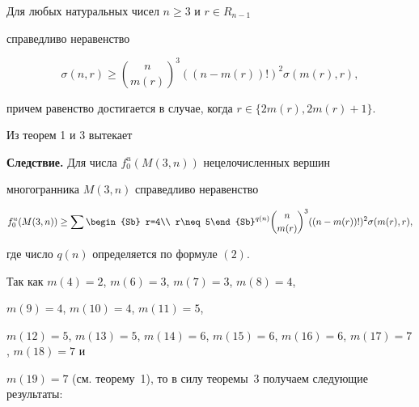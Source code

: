 \begin{thm}


Для любых натуральных чисел $n\geq 3$ и $r\in R_{n-1}$


справедливо неравенство


$$


\sigma (n,r)\geq {n\choose m(r)}^3((n-m(r))!)^2\sigma (m(r),r),


$$


причем равенство достигается в случае, когда $r\in \{2m(r), 2m(r)+1\}$.


\end{thm}





Из теорем 1 и 3 вытекает


\medskip





{\bf Следствие.} Для числа $f^u_0(M(3,n))$ нецелочисленных вершин


многогранника $M(3,n)$ справедливо неравенство


$$


f^u_0(M(3,n))\geq\sum\begin{Sb} r=4\\ r\neq 5\end{Sb}^{q(n)}


{n\choose m(r)}^3((n-m(r))!)


^2\sigma (m(r),r),


$$


где число $q(n)$ определяется по формуле $(2)$.


\medskip





Так как $m(4)=2$, $m(6)=3$, $m(7)=3$, $m(8)=4$,


$m(9)=4$, $m(10)=4$, $m(11)=5$,


$m(12)=5$, $m(13)=5$, $m(14)=6$, $m(15)=6$, $m(16)=6$, $m(17)=7$, $m(18)=7$ и


$m(19)=7$ (см. теорему~1), то в силу теоремы~3 получаем следующие результаты:


